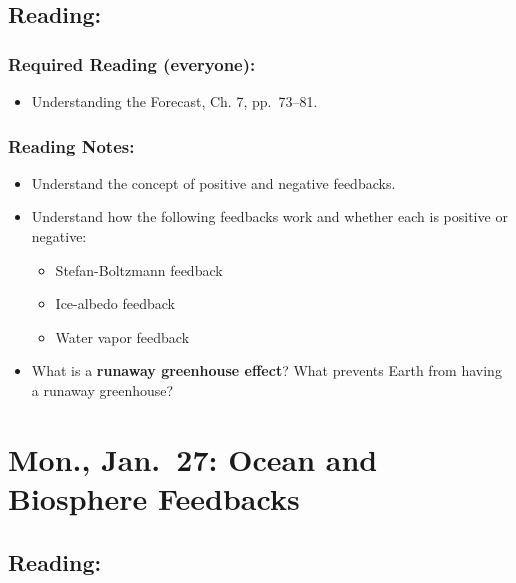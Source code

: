 \documentclass[
]{article}
\providecommand{\tightlist}{%
  \setlength{\itemsep}{0pt}\setlength{\parskip}{0pt}}
\begin{document}
\hypertarget{reading-7}{%
\subsection{Reading:}\label{reading-7}}

\hypertarget{required-reading-everyone-5}{%
\subsubsection{Required Reading
(everyone):}\label{required-reading-everyone-5}}

\begin{itemize}
\tightlist
\item
  Understanding the Forecast, Ch. 7, pp.~73--81.
\end{itemize}

\hypertarget{reading-notes-5}{%
\subsubsection{Reading Notes:}\label{reading-notes-5}}

\begin{itemize}
\item
  Understand the concept of positive and negative feedbacks.
\item
  Understand how the following feedbacks work and whether each is
  positive or negative:

  \begin{itemize}
  \tightlist
  \item
    Stefan-Boltzmann feedback
  \item
    Ice-albedo feedback
  \item
    Water vapor feedback
  \end{itemize}
\item
  What is a \textbf{runaway greenhouse effect}? What prevents Earth from
  having a runaway greenhouse?
\end{itemize}

\hypertarget{mon.-jan.-27-ocean-and-biosphere-feedbacks}{%
\section{Mon., Jan.~27: Ocean and Biosphere
Feedbacks}\label{mon.-jan.-27-ocean-and-biosphere-feedbacks}}

\hypertarget{reading-8}{%
\subsection{Reading:}\label{reading-8}}
\end{document}
